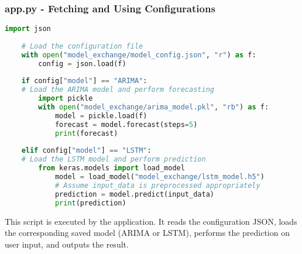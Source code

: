 \subsubsection*{app.py - Fetching and Using Configurations}
\begin{lstlisting}[language=Python, frame=single, breaklines=true]
	import json
	
	# Load the configuration file
	with open("model_exchange/model_config.json", "r") as f:
		config = json.load(f)
	
	if config["model"] == "ARIMA":
	# Load the ARIMA model and perform forecasting
		import pickle
		with open("model_exchange/arima_model.pkl", "rb") as f:
			model = pickle.load(f)
			forecast = model.forecast(steps=5)
			print(forecast)
	
	elif config["model"] == "LSTM":
	# Load the LSTM model and perform prediction
		from keras.models import load_model
			model = load_model("model_exchange/lstm_model.h5")
			# Assume input_data is preprocessed appropriately
			prediction = model.predict(input_data)
			print(prediction)
\end{lstlisting}

This script is executed by the application. It reads the configuration JSON, loads the corresponding saved model (ARIMA or LSTM), performs the prediction on user input, and outputs the result.
